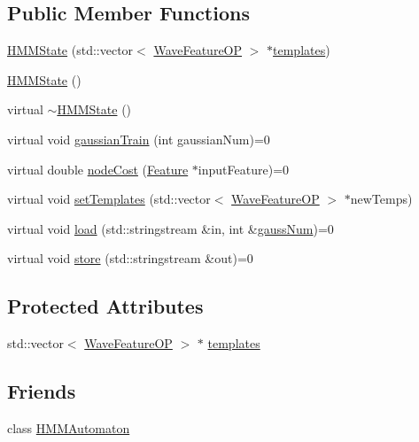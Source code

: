 \subsection*{Public Member Functions}
\begin{DoxyCompactItemize}
\item 
\hyperlink{class_h_m_m_state_a5ba34d8b1512868d649194ba16442d5b}{H\+M\+M\+State} (std\+::vector$<$ \hyperlink{class_wave_feature_o_p}{Wave\+Feature\+O\+P} $>$ $\ast$\hyperlink{class_h_m_m_state_a04d0b1a1570a339e5cd0db13aeb0d2ae}{templates})
\item 
\hyperlink{class_h_m_m_state_a7fc28ceacfa7f99b36f19523db1da73f}{H\+M\+M\+State} ()
\item 
virtual \hyperlink{class_h_m_m_state_ab2bdc4eb99ff598d7b1b2185bdaa457d}{$\sim$\+H\+M\+M\+State} ()
\item 
virtual void \hyperlink{class_h_m_m_state_a2d42dd972a85014c0f5f9875da1eacd7}{gaussian\+Train} (int gaussian\+Num)=0
\item 
virtual double \hyperlink{class_h_m_m_state_a84ad1899239f79257837e6d77cc4f242}{node\+Cost} (\hyperlink{class_feature}{Feature} $\ast$input\+Feature)=0
\item 
virtual void \hyperlink{class_h_m_m_state_ab9d6387b87e62ac03f4d15db1da7d7c7}{set\+Templates} (std\+::vector$<$ \hyperlink{class_wave_feature_o_p}{Wave\+Feature\+O\+P} $>$ $\ast$new\+Temps)
\item 
virtual void \hyperlink{class_h_m_m_state_ad5d14bf058b8fc39e07319fabebe09ee}{load} (std\+::stringstream \&in, int \&\hyperlink{pro6__demo_8cpp_a923ffcfa3c56ccdba17bc4e700247d54}{gauss\+Num})=0
\item 
virtual void \hyperlink{class_h_m_m_state_ab12116fc28ade677ee79ff13b4577ea6}{store} (std\+::stringstream \&out)=0
\end{DoxyCompactItemize}
\subsection*{Protected Attributes}
\begin{DoxyCompactItemize}
\item 
std\+::vector$<$ \hyperlink{class_wave_feature_o_p}{Wave\+Feature\+O\+P} $>$ $\ast$ \hyperlink{class_h_m_m_state_a04d0b1a1570a339e5cd0db13aeb0d2ae}{templates}
\end{DoxyCompactItemize}
\subsection*{Friends}
\begin{DoxyCompactItemize}
\item 
class \hyperlink{class_h_m_m_state_a3f73063e67c75773ba856636249277b6}{H\+M\+M\+Automaton}
\end{DoxyCompactItemize}


